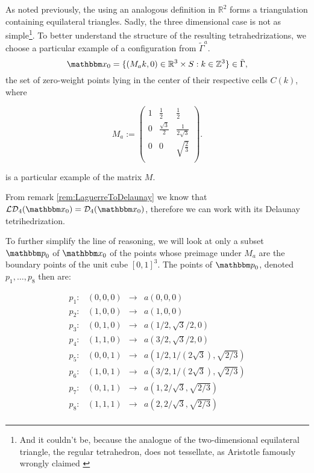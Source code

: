 \begin{remark}
As noted previously, the using an analogous definition in $\mathbb R^2$ forms a triangulation containing equilateral triangles. Sadly, the three dimensional case is not as simple\footnote{And it couldn't be, because the analogue of the two-dimensional equilateral triangle, the regular tetrahedron, does not tessellate, as Aristotle famously wrongly claimed \cite{Lagarias12}}.
To better understand the structure of the resulting tetrahedrizations, we choose a particular example of a configuration from $\tilde\Gamma^a$. 
$$\x_0 = \{(M_ak,0) \in \Rt\times S: k \in \mathbb Z^3\} \in \tilde\Gamma,$$ 
the set of zero-weight points lying in the center of their respective cells $C(k)$, where

$$
M_a := \begin{pmatrix}
1 & \frac 12 & \frac 12 \\
0 & \frac {\sqrt{3}}2 & \frac 1{2\sqrt{3}}  \\
0 & 0 & \sqrt{\frac 23} \\
\end{pmatrix}.
$$

is a particular example of the matrix $M$.

From remark \ref{rem:LaguerreToDelaunay} we know that $\mathcal {LD}_4(\x_0) = \mathcal D_4(\x_0)$, therefore we can work with its Delaunay tetrihedrization.

To further simplify the line of reasoning, we will look at only a subset $\p_0$ of $\x_0$ of the points whose preimage under $M_a$ are the boundary points of the unit cube $[0,1]^3$. The points of $\p_0$, denoted $p_1, \dots, p_8$ then are:


$$\begin{matrix}
	p_1: & (0,0,0) & \rightarrow & a(0,0,0) \\
	p_2: & (1,0,0) & \rightarrow & a(1,0,0)\\
	p_3: & (0,1,0) & \rightarrow & a(1/2,\sqrt{3}/2,0)\\
	p_4: & (1,1,0) & \rightarrow & a(3/2,\sqrt{3}/2,0)\\

	p_5: & (0,0,1) & \rightarrow & a(1/2,1/(2\sqrt{3}),\sqrt{2/3})\\
	p_6: & (1,0,1) & \rightarrow & a(3/2,1/(2\sqrt{3}),\sqrt{2/3})\\
	p_7: & (0,1,1) & \rightarrow & a(1,2/\sqrt3, \sqrt{2/3})\\
	p_8: & (1,1,1) & \rightarrow & a(2,2/\sqrt3, \sqrt{2/3})\\
\end{matrix}$$


\end{remark}
